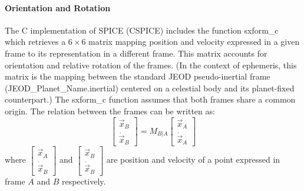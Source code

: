 \paragraph{Orientation and Rotation}
The C implementation of SPICE (CSPICE) includes  the function sxform\_c which
retrieves a $6 \times 6$ matrix mapping position and velocity expressed in a
given frame to its representation in a different frame.  This matrix accounts
for orientation and relative rotation of the frames. (In the context of
ephemeris, this matrix is the mapping between the standard JEOD
pseudo-inertial frame (JEOD\_Planet\_Name.inertial)
centered on a celestial body and its planet-fixed counterpart.)  The sxform\_c
function assumes that both frames share a common origin. The relation
between the frames can be written as:
\begin{equation}
\left [\begin{array}{c}\vec x_B \\ \dot{\vec{x}}_B \end{array}\right ] =
M_{B|A} \left [\begin{array}{c} \vec x_A \\ \dot{\vec{x}}_A \end{array}
\right ]
\label{eq:m6}
\end{equation}
\noindent where
$\left [\begin{array}{c}\vec x_A \\ \dot{\vec{x}}_B \end{array}\right ]$
and
$\left [\begin{array}{c}\vec x_B \\ \dot{\vec{x}}_B \end{array}\right ]$
are position and velocity of a point expressed in frame $A$ and $B$
respectively.

